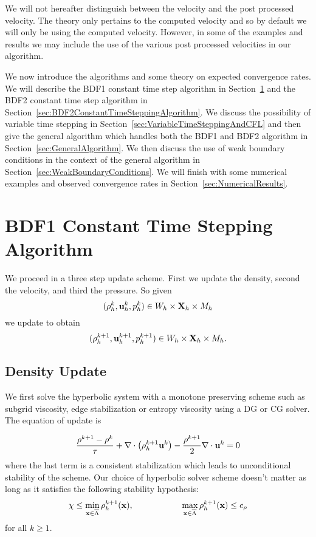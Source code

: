 \documentclass[letterpaper]{erdc}
\begin{document}
\begin{remark}
We will not hereafter distinguish between the velocity and the post processed velocity.  The theory only pertains to the computed velocity and so by default we will only be using the computed velocity.  However, in some of the examples and results we may include the use of the various post processed velocities in our algorithm.
\end{remark}

We now introduce the algorithms and some theory on expected convergence rates.  We will describe the BDF1 constant time step algorithm in Section~\ref{sec:BDF1ConstantTimeSteppingAlgorithm} and the BDF2 constant time step algorithm in Section~\ref{sec:BDF2ConstantTimeSteppingAlgorithm}. We discuss the possibility of variable time stepping in Section~\ref{sec:VariableTimeSteppingAndCFL} and then give the general algorithm which handles both the BDF1 and BDF2 algorithm in Section~\ref{sec:GeneralAlgorithm}.  We then discuss the use of weak boundary conditions in the context of the general algorithm in Section~\ref{sec:WeakBoundaryConditions}.  We will finish with some numerical examples and observed convergence rates in Section~\ref{sec:NumericalResults}.

%
%
%
\section{BDF1 Constant Time Stepping Algorithm}\label{sec:BDF1ConstantTimeSteppingAlgorithm}
We proceed in a three step update scheme.  First we update the density,  second the velocity, and third the pressure.  So given
\begin{equation}(\rho^{k}_h, \textbf{u}^{k}_{h}, p^{k}_h) \in W_h\times\textbf{X}_h\times M_h  \end{equation}
we update to obtain
\begin{equation}(\rho^{k+1}_h, \textbf{u}^{k+1}_{h}, p^{k+1}_h) \in W_h\times\textbf{X}_h\times M_h.\end{equation}

%
%
\subsection{Density Update}

We first solve the hyperbolic system with a monotone preserving scheme such as subgrid viscosity, edge stabilization or entropy viscosity using a DG or CG solver.  The equation of update is

\begin{equation}
  \frac{\rho^{k+1} - \rho^k}{\tau} + \nabla\cdot\left(\rho_h^{k+1}\textbf{u}^{k} \right) - \frac{\rho^{k+1}}{2}\nabla\cdot\textbf{u}^{k} = 0
\end{equation}
where the last term is a consistent stabilization which leads to unconditional stability of the scheme.   Our choice of hyperbolic solver scheme doesn't matter as long as it satisfies the following stability hypothesis:
\begin{equation}
  \chi \leq \displaystyle\min_{\textbf{x}\in\overline{\Lambda}} \rho_h^{k+1}(\textbf{x}), \hspace{2cm} \displaystyle\max_{\textbf{x}\in\overline{\Lambda}} \rho_{h}^{k+1}(\textbf{x}) \leq c_{\rho}
\end{equation}
for all $k\geq 1$.
\end{document}
